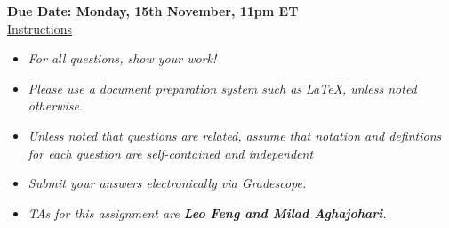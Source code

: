 \documentclass[12pt]{article}
\theoremstyle{definition}
\begin{document}
\fancyhead{}
\fancyfoot{}


\vspace{1cm}

\shorthandoff{:}
{\bf Due Date: Monday, 15th November, 11pm ET}
\\

\vspace{-0.5cm}
\underline{Instructions}%
\renewcommand{\labelitemi}{\textbullet}
\begin{itemize}
\item \emph{For all questions, show your work!}
\item \emph{Please use a document preparation system such as LaTeX, unless noted otherwise.}
\item \emph{Unless noted that questions are related, assume that notation and defintions for each question are self-contained and independent}
\item \emph{Submit your answers electronically via Gradescope.}
\item \emph{TAs for this assignment are \textbf{Leo Feng and Milad Aghajohari}.}
\end{itemize}
\end{document}
